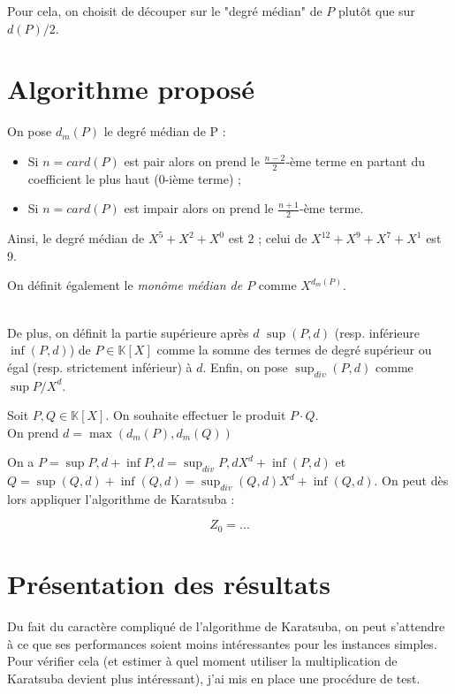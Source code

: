 \documentclass{article}
\begin{document}
Pour cela, on choisit de découper sur le "degré médian" de $P$ plutôt que sur $d(P) / 2$.

\section{Algorithme proposé}

On pose $d_m(P)$ le degré médian de P :

\begin{itemize}
	\item Si $n = card(P)$ est pair alors on prend le $\frac{n-2}{2}$-ème terme en partant du coefficient le plus haut ($0$-ième terme) ;
	\item Si $n = card(P)$ est impair alors on prend le $\frac{n + 1}{2}$-ème terme. \\
\end{itemize}

Ainsi, le degré médian de $X^5 + X^2 + X^0$ est $2$ ; celui de $X^12 + X^9 + X^7 + X^1$ est 9.

On définit également le \emph{monôme médian de $P$} comme $X^{d_m(P)}$.

\ \\

De plus, on définit la partie supérieure après $d$ $\sup(P, d)$ (resp. inférieure $\inf(P, d)$) de $P \in \mathbb{K}[X]$ comme la somme des termes de degré supérieur ou égal (resp. strictement inférieur) à $d$. Enfin, on pose $\sup_{div}(P, d)$ comme $\sup{P} / X^{d}$.

Soit $P, Q \in \mathbb{K}[X]$. On souhaite effectuer le produit $P \cdot Q$. \\

On prend $d = \max(d_m(P), d_m(Q)) $

On a $P = \sup{P, d} + \inf{P,d } = \sup_{div}{P,d } X^{d} + \inf(P, d) $ et $ Q = \sup(Q, d) + \inf(Q, d) = \sup_{div}(Q, d) X^{d} + \inf(Q, d) $.  On peut dès lors appliquer l'algorithme de Karatsuba :

\begin{equation}
	Z_0 = ...
\end{equation}

\section{Présentation des résultats}

Du fait du caractère compliqué de l'algorithme de Karatsuba, on peut s'attendre à ce que ses performances soient moins intéressantes pour les instances simples. Pour vérifier cela (et estimer à quel moment utiliser la multiplication de Karatsuba devient plus intéressant), j'ai mis en place une procédure de test.
\end{document}
